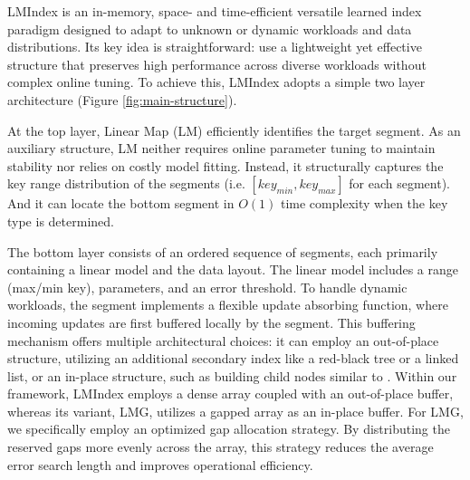 
LMIndex is an in-memory, space- and time-efficient versatile learned index paradigm designed to adapt to unknown or dynamic workloads and data
distributions. Its key idea is straightforward: use a lightweight yet effective structure that preserves high performance across diverse workloads without complex online tuning. To achieve this, LMIndex adopts a simple two layer architecture (Figure \ref{fig:main-structure}).

At the top layer, Linear Map (LM) efficiently identifies the target segment. As an auxiliary structure, LM neither requires online parameter tuning to maintain stability nor relies on costly model fitting. Instead, it structurally captures the key range distribution of the segments (i.e. $[key_{min}, key_{max}]$ for each segment). And it can locate the bottom segment in $O(1)$ time complexity when the key type is determined.

The bottom layer consists of an ordered sequence of segments, each primarily containing a linear model and the data layout. The linear model includes a range (max/min key), parameters, and an error threshold. To handle dynamic workloads, the segment implements a flexible update absorbing function, where incoming updates are first buffered locally by the segment. This buffering mechanism offers multiple architectural choices: it can employ an out-of-place structure, utilizing an additional secondary index like a red-black tree or a linked list, or an in-place structure, such as building child nodes similar to \cite{lipp21}. Within our framework, LMIndex employs a dense array coupled with an out-of-place buffer, whereas its variant, LMG, utilizes a gapped array as an in-place buffer. For LMG, we specifically employ an optimized gap allocation strategy. By distributing the reserved gaps more evenly across the array, this strategy reduces the average error search length and improves operational efficiency.


